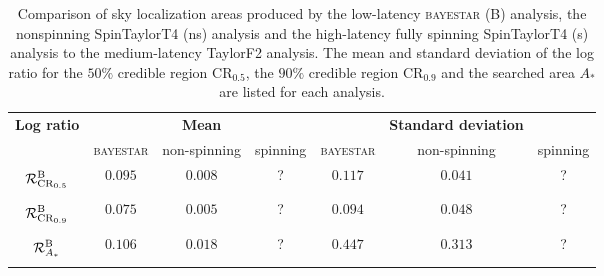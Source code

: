 \begin{table}
\begin{tabular}{ccccccc}
\textbf{Log ratio} & & \textbf{Mean} & & & \textbf{Standard deviation} & \\   
 & \textsc{bayestar} & non-spinning & spinning & \textsc{bayestar} & non-spinning & spinning \\
$\displaystyle \vphantom{\frac{0}{0}} \mathcal{R}^\mathrm{B}_{\mathrm{CR}_{0.5}}$ & $0.095$ & $0.008$ & ? & $0.117$ & $0.041$ & ? \\
$\displaystyle \vphantom{\frac{0}{0}} \mathcal{R}^\mathrm{B}_{\mathrm{CR}_{0.9}}$ & $0.075$ & $0.005$ & ? & $0.094$ & $0.048$ & ? \\
$\displaystyle \vphantom{\frac{0}{0}} \mathcal{R}^\mathrm{B}_{A_\ast}$ & $0.106$ & $0.018$ & ? & $0.447$ & $0.313$ & ?
\end{tabular}
\caption{\label{tab:sky-ratio} Comparison of sky localization areas produced by the low-latency \textsc{bayestar} (B) analysis, the nonspinning SpinTaylorT4 (ns) analysis and the high-latency fully spinning SpinTaylorT4 (s) analysis to the medium-latency TaylorF2 analysis. The mean and standard deviation of the log ratio for the $50\%$ credible region $\mathrm{CR}_{0.5}$, the $90\%$ credible region $\mathrm{CR}_{0.9}$ and the searched area $A_\ast$ are listed for each analysis.}

\end{table}